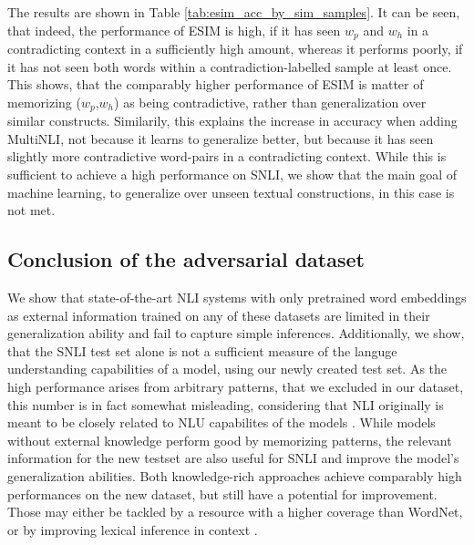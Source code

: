 The results are shown in Table \ref{tab:esim_acc_by_sim_samples}.
It can be seen, that indeed, the performance of \ac{ESIM} is high, if it has seen $w_p$ and $w_h$ in a contradicting context in a sufficiently high amount, whereas it performs poorly, if it has not seen both words within a contradiction-labelled sample at least once. This shows, that the comparably higher performance of ESIM is matter of memorizing ($w_p$,$w_h$) as being contradictive, rather than generalization over similar constructs. Similarily, this explains the increase in accuracy when adding \ac{MultiNLI}, not because it learns to generalize better, but because it has seen slightly more contradictive word-pairs in a contradicting context. While this is sufficient to achieve a high performance on \ac{SNLI}, we show that the main goal of machine learning, to generalize over unseen textual constructions, in this case is not met. 

\subsection{Conclusion of the adversarial dataset}
We show that state-of-the-art NLI systems with only pretrained word embeddings as external information trained on any of these datasets are limited in their generalization ability and fail to capture simple inferences. Additionally, we show, that the SNLI test set alone is not a sufficient measure of the languge understanding capabilities of a model, using our newly created test set. As the high performance arises from arbitrary patterns, that we excluded in our dataset, this number is in fact somewhat misleading, considering that \ac{NLI} originally is meant to be closely related to \ac{NLU} capabilites of the models \citep{williams2017broad}. While models without external knowledge perform good by memorizing patterns, the relevant information for the new testset are also useful for \ac{SNLI} and improve the model's generalization abilities. Both knowledge-rich approaches achieve comparably high performances on the new dataset, but still have a potential for improvement. Those may either be tackled by a resource with a higher coverage than WordNet, or by improving lexical inference in context \citep{shwartz2016adding}.